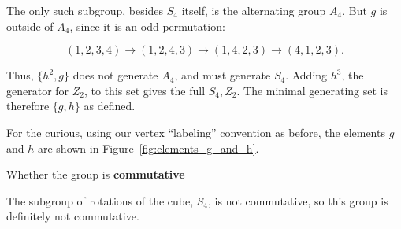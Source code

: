 \documentclass[../gatm_answers.tex]{subfiles}
\begin{document}
The only such subgroup, besides $S_4$ itself, is the alternating group $A_4$. But $g$ is outside of $A_4$, since it is an odd permutation:

$$(1,2,\boxed{3,4})\to (1,\boxed{2,4},3)\to (\boxed{1,4},2,3) \to (4,1,2,3).$$

Thus, $\{h^2,g\}$ does not generate $A_4$, and must generate $S_4$. Adding $h^3$, the generator for $Z_2$, to this set gives the full $S_4,Z_2$. The minimal generating set is therefore $\{g,h\}$ as defined.

For the curious, using our vertex ``labeling'' convention as before, the elements $g$ and $h$ are shown in Figure~\ref{fig:elements_g_and_h}.

\begin{inner_problem}
\item Whether the group is \textbf{commutative}
\end{inner_problem}

\noindent The subgroup of rotations of the cube, $S_4$, is not commutative, so this group is definitely not commutative.

\pagebreak
\end{document}
